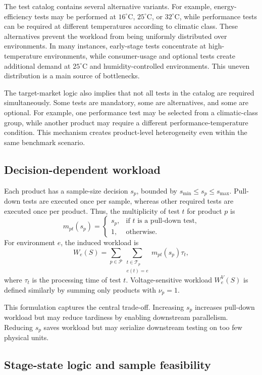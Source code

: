 \documentclass[11pt]{article}
\begin{document}
The test catalog contains several alternative variants. For example, energy-efficiency tests may be performed at \(16^\circ\mathrm{C}\), \(25^\circ\mathrm{C}\), or \(32^\circ\mathrm{C}\), while performance tests can be required at different temperatures according to climatic class. These alternatives prevent the workload from being uniformly distributed over environments. In many instances, early-stage tests concentrate at high-temperature environments, while consumer-usage and optional tests create additional demand at \(25^\circ\mathrm{C}\) and humidity-controlled environments. This uneven distribution is a main source of bottlenecks.

The target-market logic also implies that not all tests in the catalog are required simultaneously. Some tests are mandatory, some are alternatives, and some are optional. For example, one performance test may be selected from a climatic-class group, while another product may require a different performance-temperature condition. This mechanism creates product-level heterogeneity even within the same benchmark scenario.

\subsection{Decision-dependent workload}
\label{subsec:workload}

Each product has a sample-size decision \(s_p\), bounded by \(s_{\min} \le s_p \le s_{\max}\). Pull-down tests are executed once per sample, whereas other required tests are executed once per product. Thus, the multiplicity of test \(t\) for product \(p\) is
\[
m_{pt}(s_p)=
\begin{cases}
s_p, & \text{if }t\text{ is a pull-down test,}\\
1, & \text{otherwise.}
\end{cases}
\]
For environment \(e\), the induced workload is
\[
W_e(S)=
\sum_{p\in\mathcal{P}}
\sum_{\substack{t\in\mathcal{T}_p\\e(t)=e}}
m_{pt}(s_p)\tau_t,
\]
where \(\tau_t\) is the processing time of test \(t\). Voltage-sensitive workload \(W_e^V(S)\) is defined similarly by summing only products with \(\nu_p=1\).

This formulation captures the central trade-off. Increasing \(s_p\) increases pull-down workload but may reduce tardiness by enabling downstream parallelism. Reducing \(s_p\) saves workload but may serialize downstream testing on too few physical units.

\subsection{Stage-state logic and sample feasibility}
\label{subsec:stage_logic}
\end{document}
